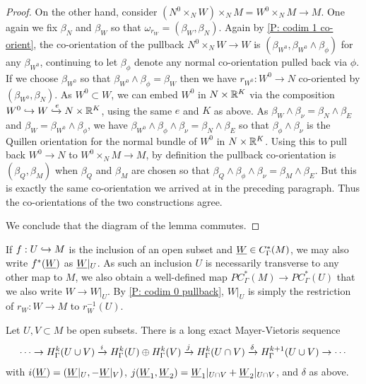\begin{proof}
On the other hand, consider $(N^0\times_N W)\times_N M = W^0\times_NM \to M$. One again we fix $\beta_N$ and $\beta_W$ so that $\omega_{r_W} = (\beta_W,\beta_N)$. Again by \cref{P: codim 1 co-orient}, the co-orientation of the pullback $N^0\times_N W \to W$ is $(\beta_{W^0},\beta_{W^0} \wedge \beta_\phi)$ for any $\beta_{W^0}$, continuing to let $\beta_\phi$ denote any normal co-orientation pulled back via $\phi$. If we choose $\beta_{W^0}$ so that $\beta_{W^0} \wedge \beta_\phi = \beta_W$ then we have $r_{W^0}:W^0 \to N$ co-oriented by $(\beta_{W^0},\beta_N)$. As $W^0 \subset W$, we can embed $W^0$ in $N \times \mathbb{R}^K$ via the composition $W^0\hookrightarrow W \xhookrightarrow{e}N \times \mathbb{R}^K$, using the same $e$ and $K$ as above. As $\beta_W \wedge \beta_\nu = \beta_N \wedge \beta_E$ and $\beta_W = \beta_{W^0} \wedge \beta_\phi$, we have $\beta_{W^0} \wedge \beta_\phi \wedge \beta_\nu = \beta_N \wedge \beta_E$ so that $\beta_\phi \wedge \beta_\nu$ is the Quillen orientation for the normal bundle of $W^0$ in $N \times \mathbb{R}^K$. Using this to pull back $W^0 \to N$ to $W^0\times_NM \to M$, by definition the pullback co-orientation is $(\beta_Q,\beta_M)$ when $\beta_Q$ and $\beta_M$ are chosen so that $\beta_Q \wedge \beta_\phi \wedge \beta_\nu = \beta_M \wedge \beta_E$. But this is exactly the same co-orientation we arrived at in the preceding paragraph. Thus the co-orientations of the two constructions agree.


We conclude that the diagram of the lemma commutes.
\end{proof}


\begin{notation}
If $f: U\hookrightarrow M$ is the inclusion of an open subset and $\underline{W} \in C^*_\Gamma(M)$, we may also write $f^*(\underline{W})$ as $\underline{W}|_U$. As such an inclusion $U$ is necessarily transverse to any other map to $M$, we also obtain a well-defined map $PC^*_\Gamma(M) \to PC^*_\Gamma(U)$ that we also write $W \to W|_U$. By \cref{P: codim 0 pullback}, $W|_U$ is simply the restriction of $r_W \colon W \to M$ to $r_W^{-1}(U)$.
\end{notation}

\begin{theorem}\label{T: absolute MV}
Let $U,V \subset M$ be open subsets. There is a long exact Mayer-Vietoris sequence
$$\cdots \to H^k_\Gamma(U \cup V)\xrightarrow{i} H^k_\Gamma(U) \oplus H^k_\Gamma(V)\xrightarrow{j} H^k_\Gamma(U \cap V)\xrightarrow{\delta} H^{k+1}_\Gamma(U \cup V)\to\cdots$$
with $i(\underline{W}) = (\underline{W}|_U, -\underline{W}|_V)$, $j(\underline{W}_1,\underline{W}_2) = \underline{W}_1|_{U \cap V}+\underline{W}_2|_{U \cap V}$, and $\delta$ as above.
\end{theorem}



